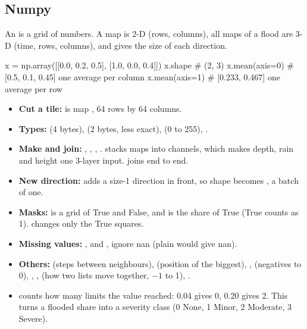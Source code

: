 \subsection{Numpy}\label{py:numpy}
An  is a grid of numbers. A map is 2-D (rows, columns), all maps of a flood are 3-D (time, rows, columns), and  gives the size of each direction.
\begin{pycode}
x = np.array([[0.0, 0.2, 0.5], [1.0, 0.0, 0.4]])
x.shape         # (2, 3)
x.mean(axis=0)  # [0.5, 0.1, 0.45]  one average per column
x.mean(axis=1)  # [0.233, 0.467]    one average per row
\end{pycode}
\begin{itemize}
\item \textbf{Cut a tile:}  is map , 64 rows by 64 columns.
\item \textbf{Types:}  (4 bytes),  (2 bytes, less exact),  (0 to 255), .
\item \textbf{Make and join:} , , , .  stacks maps into channels, which makes depth, rain and height one 3-layer input.  joins end to end.
\item \textbf{New direction:}  adds a size-1 direction in front, so shape  becomes , a batch of one.
\item \textbf{Masks:}  is a grid of True and False, and  is the share of True (True counts as 1).  changes only the True squares.
\item \textbf{Missing values:} , and ,  ignore nan (plain  would give nan).
\item \textbf{Others:}  (steps between neighbours),  (position of the biggest), ,  (negatives to 0), , ,  (how two lists move together, $-1$ to 1), .
\item {} counts how many limits the value reached: 0.04 gives 0, 0.20 gives 2. This turns a flooded share into a severity class (0 None, 1 Minor, 2 Moderate, 3 Severe).
\end{itemize}

